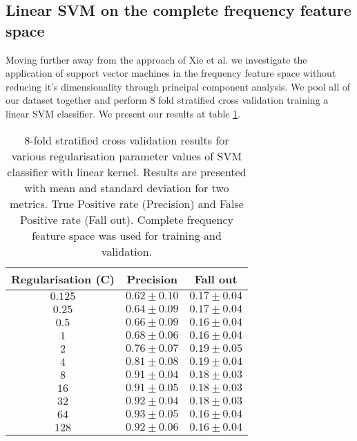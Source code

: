 \documentclass[reqno,openany,12pt]{amsbook}
\begin{document}
%
%

%
%


\subsection{Linear SVM on the complete frequency feature space}

\indent Moving further away from the approach of Xie et al.\cite{adf1} we investigate the application of support vector machines in the frequency feature space without reducing it's dimensionality through principal component analysis. We pool all of our dataset together and perform 8 fold stratified cross validation training a linear SVM classifier. We present our results at table \ref{svmt4}.

\begin{table}
\begin{tabular}{|c|c|c|}
\hline
Regularisation (C) &  Precision & Fall out \\ \hline 
$0.125$ &  $0.62 \pm 0.10$ & $0.17 \pm 0.04$ \\ \hline 
$0.25$ &  $0.64 \pm 0.09$ & $0.17 \pm 0.04$ \\ \hline 
$0.5$ &  $0.66 \pm 0.09$ & $0.16 \pm 0.04$ \\ \hline 
$1$ &  $0.68 \pm 0.06$ & $0.16 \pm 0.04$ \\ \hline 
$2$ &  $0.76 \pm 0.07$ & $0.19 \pm 0.05$ \\ \hline 
$4$ &  $0.81 \pm 0.08$ & $0.19 \pm 0.04$ \\ \hline 
$8$ &  $0.91 \pm 0.04$ & $0.18 \pm 0.03$ \\ \hline 
$16$ &  $0.91 \pm 0.05$ & $0.18 \pm 0.03$ \\ \hline 
$32$ &  $0.92 \pm 0.04$ & $0.18 \pm 0.03$ \\ \hline
$64$ &  $0.93 \pm 0.05$ & $0.16 \pm 0.04$ \\ \hline
$128$ &  $0.92 \pm 0.06$ & $0.16 \pm 0.04$ \\ \hline
\end{tabular}
\vspace{5pt}
\caption[Cross Validation and Linear SVM regularisation on complete frequency feature space.]{8-fold stratified cross validation results for various regularisation parameter values of SVM classifier with linear kernel. Results are presented with mean and standard deviation for two metrics. True Positive rate (Precision) and False Positive rate (Fall out). Complete frequency feature space was used for training and validation.}
\label{svmt4}
\end{table}
\end{document}
